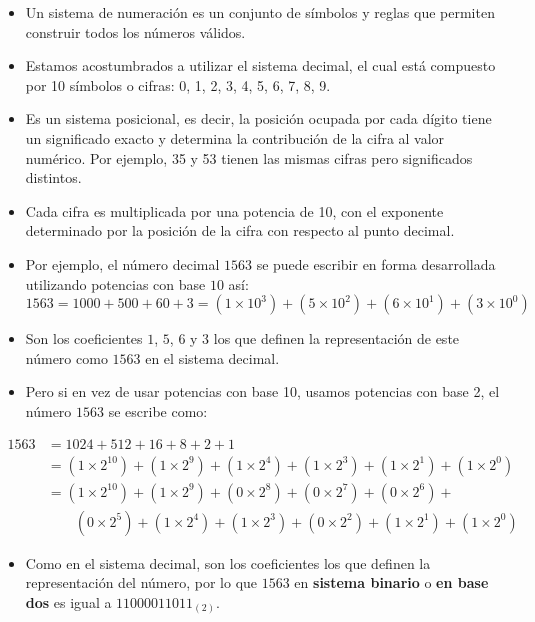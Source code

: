\documentclass[]{book}
\providecommand{\tightlist}{%
  \setlength{\itemsep}{0pt}\setlength{\parskip}{0pt}}
\begin{document}
\begin{itemize}
\tightlist
\item
  Un sistema de numeración es un conjunto de símbolos y reglas que permiten construir todos los números válidos.
\item
  Estamos acostumbrados a utilizar el sistema decimal, el cual está compuesto por 10 símbolos o cifras: 0, 1, 2, 3, 4, 5, 6, 7, 8, 9.
\item
  Es un sistema posicional, es decir, la posición ocupada por cada dígito tiene un significado exacto y determina la contribución de la cifra al valor numérico. Por ejemplo, 35 y 53 tienen las mismas cifras pero significados distintos.
\item
  Cada cifra es multiplicada por una potencia de 10, con el exponente determinado por la posición de la cifra con respecto al punto decimal.
\item
  Por ejemplo, el número decimal \(1563\) se puede escribir en forma desarrollada utilizando potencias con base \(10\) así:
  \[1563 = 1000 + 500 + 60 + 3 = (1 \times 10^3) + (5 \times 10^2) + (6 \times 10^1) + (3 \times 10^0)\]
\item
  Son los coeficientes \(1\), \(5\), \(6\) y \(3\) los que definen la representación de este número como \(1563\) en el sistema decimal.
\item
  Pero si en vez de usar potencias con base 10, usamos potencias con base 2, el número \(1563\) se escribe como:
\end{itemize}

\[
\begin{aligned}
1563 & = 1024 + 512 + 16 + 8 + 2 + 1  \\
    &= (1 \times 2^{10}) + (1 \times 2^9) + (1 \times 2^4) + (1 \times 2^3) + (1 \times 2^1) + (1 \times 2^0) \\
    &= (1 \times 2^{10}) + (1 \times 2^9) + (0 \times 2^8) + (0 \times 2^7) + (0 \times 2^6) + \\
&\qquad (0 \times 2^5) + (1 \times 2^4) + (1 \times 2^3) + (0 \times 2^2) + (1 \times 2^1) + (1 \times 2^0)
\end{aligned} 
\]

\begin{itemize}
\tightlist
\item
  Como en el sistema decimal, son los coeficientes los que definen la representación del número, por lo que \(1563\) en \textbf{sistema binario} o \textbf{en base dos} es igual a \(11000011011_{(2)}\).
\end{itemize}
\end{document}
